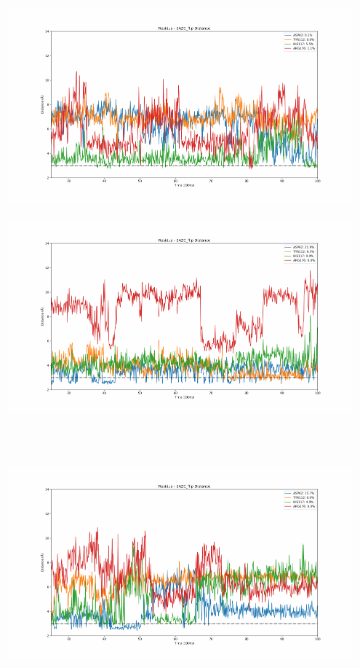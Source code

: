 \begin{figure}[!ht]
\centering
  \begin{subfigure}{.45\textwidth}
     \centering
     \includegraphics[width=.95\linewidth]{chapter4/2AZC_flip/2AZC_flip-dist_0.pdf}
  \end{subfigure}
  \begin{subfigure}{.45\textwidth}
     \centering
     \includegraphics[width=.95\linewidth]{chapter4/2AZC_flip/2AZC_flip-dist_1.pdf}
  \end{subfigure}
  \\
  \begin{subfigure}{.45\textwidth}
     \centering
     \includegraphics[width=.95\linewidth]{chapter4/2AZC_flip/2AZC_flip-dist_2.pdf}

\end{subfigure}
\end{figure}
